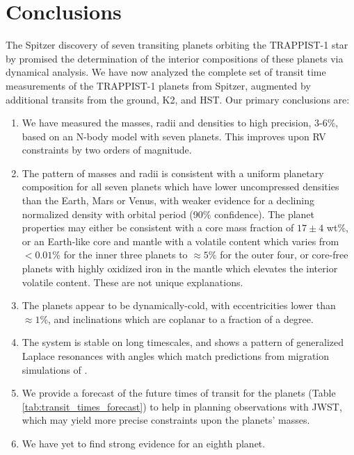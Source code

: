 \documentclass[twocolumn]{aastex63}
\begin{document}
\section{Conclusions} \label{sec:conclusions}

The Spitzer discovery of seven transiting planets orbiting the TRAPPIST-1 star by \citet{Gillon2017} promised the determination of the interior compositions of these planets via dynamical analysis.
We have now analyzed the complete set of transit time measurements
of the TRAPPIST-1 planets from  Spitzer, augmented by
additional transits from the ground, K2, and HST.  Our primary conclusions
are:

\begin{enumerate}
    \item  We have measured the masses, radii and densities to high precision, 3-6\%, based on an N-body model with seven planets.  This improves upon RV constraints by two orders of magnitude.
    \item  The pattern of masses and radii is consistent with a uniform planetary composition for all seven planets
    which have lower uncompressed densities than the Earth, Mars or Venus, with weaker evidence for a declining normalized density with orbital period (90\% confidence). The planet properties may either be consistent with 
    a core mass fraction of $17{\pm}4$ wt\%, or an Earth-like core and mantle with a volatile
    content which varies from ${<}0.01$\% for the inner three planets to ${\approx} 5$\%
    for the outer four, or core-free planets with highly oxidized iron in the mantle which elevates the interior volatile content.  These are not unique explanations.
    \item  The planets appear to be dynamically-cold, with eccentricities lower than
    ${\approx }1$\%, and inclinations which are coplanar to a fraction of a degree.
    \item The system is stable on long timescales, and shows a pattern of generalized Laplace resonances with angles which match predictions from migration simulations of \citet{Mah2018}.
    \item We provide a forecast of the future times of transit for the planets (Table \ref{tab:transit_times_forecast}) to help in planning observations with JWST, which may yield more precise constraints upon the planets' masses.
    \item We have yet to find strong evidence for an eighth planet.
\end{enumerate}
\end{document}
